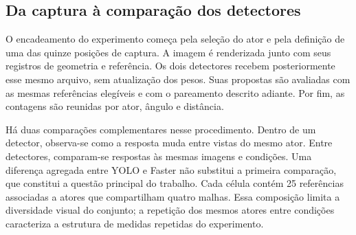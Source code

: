 \subsection{Da captura à comparação dos detectores}
O encadeamento do experimento começa pela seleção do ator e pela definição de uma das quinze posições de captura. A imagem é renderizada junto com seus registros de geometria e referência. Os dois detectores recebem posteriormente esse mesmo arquivo, sem atualização dos pesos. Suas propostas são avaliadas com as mesmas referências elegíveis e com o pareamento descrito adiante. Por fim, as contagens são reunidas por ator, ângulo e distância.

Há duas comparações complementares nesse procedimento. Dentro de um detector, observa-se como a resposta muda entre vistas do mesmo ator. Entre detectores, comparam-se respostas às mesmas imagens e condições. Uma diferença agregada entre YOLO e Faster não substitui a primeira comparação, que constitui a questão principal do trabalho. Cada célula contém 25 referências associadas a atores que compartilham quatro malhas. Essa composição limita a diversidade visual do conjunto; a repetição dos mesmos atores entre condições caracteriza a estrutura de medidas repetidas do experimento.

